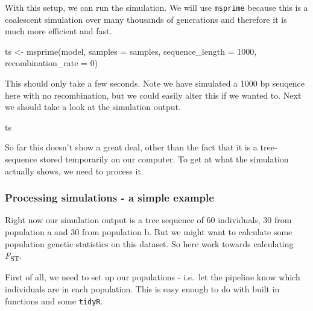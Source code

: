 \documentclass[
  letterpaper,
  DIV=11,
  numbers=noendperiod]{scrartcl}
\newenvironment{Shaded}{\begin{snugshade}}{\end{snugshade}}
\newcommand{\AttributeTok}[1]{\textcolor[rgb]{0.40,0.45,0.13}{#1}}
\newcommand{\DecValTok}[1]{\textcolor[rgb]{0.68,0.00,0.00}{#1}}
\newcommand{\FunctionTok}[1]{\textcolor[rgb]{0.28,0.35,0.67}{#1}}
\newcommand{\NormalTok}[1]{\textcolor[rgb]{0.00,0.23,0.31}{#1}}
\newcommand{\OtherTok}[1]{\textcolor[rgb]{0.00,0.23,0.31}{#1}}
\newcommand{\SpecialCharTok}[1]{\textcolor[rgb]{0.37,0.37,0.37}{#1}}
\begin{document}
With this setup, we can run the simulation. We will use \texttt{msprime}
because this is a coalescent simulation over many thousands of
generations and therefore it is much more efficient and fast.

\begin{Shaded}
\begin{Highlighting}[]
\NormalTok{ts }\OtherTok{\textless{}{-}} \FunctionTok{msprime}\NormalTok{(model, }\AttributeTok{samples =}\NormalTok{ samples, }\AttributeTok{sequence\_length =} \DecValTok{1000}\NormalTok{, }\AttributeTok{recombination\_rate =} \DecValTok{0}\NormalTok{)}
\end{Highlighting}
\end{Shaded}

This should only take a few seconds. Note we have simulated a 1000 bp
seuqence here with no recombination, but we could easily alter this if
we wanted to. Next we should take a look at the simulation output.

\begin{Shaded}
\begin{Highlighting}[]
\NormalTok{ts }
\end{Highlighting}
\end{Shaded}

So far this doesn't show a great deal, other than the fact that it is a
tree-sequence stored temporarily on our computer. To get at what the
simulation actually shows, we need to process it.

\hypertarget{processing-simulations---a-simple-example}{%
\subsubsection{Processing simulations - a simple
example}\label{processing-simulations---a-simple-example}}

Right now our simulation output is a tree sequence of 60 individuals, 30
from population a and 30 from population b. But we might want to
calculate some population genetic statistics on this dataset. So here
work towards calculating \emph{F}\textsubscript{ST}.

First of all, we need to set up our populations - i.e.~let the pipeline
know which individuals are in each population. This is easy enough to do
with built in functions and some \texttt{tidyR}.

\begin{Shaded}
\end{Shaded}
\end{document}
